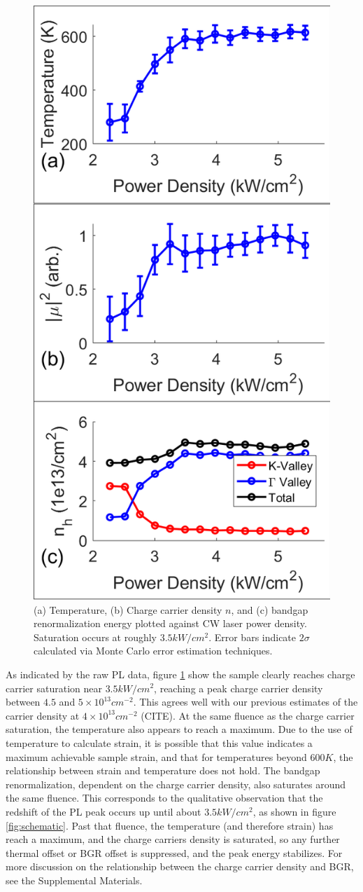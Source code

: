 \documentclass[aps,prl,preprint,superscriptaddress]{revtex4-2}
\begin{document}
\begin{figure}
	\includegraphics[width=0.5\linewidth]{fig_pars.png}
	\caption{(a) Temperature, (b) Charge carrier density $n$, and (c) bandgap renormalization energy plotted against CW laser power density. Saturation occurs at roughly $3.5 kW/cm^2$. Error bars indicate $2\sigma$ calculated via Monte Carlo error estimation techniques.}
	\label{fig:pars}
\end{figure}

As indicated by the raw PL data, figure \ref{fig:pars} show the sample clearly reaches charge carrier saturation near $3.5 kW/cm^2$, reaching a peak charge carrier density between $4.5$ and $5\times 10^{13}  cm^{-2}$. This agrees well with our previous estimates of the carrier density at $4 \times 10^{13}  cm^{-2}$ (CITE). At the same fluence as the charge carrier saturation, the temperature also appears to reach a maximum. Due to the use of temperature to calculate strain, it is possible that this value indicates a maximum achievable sample strain, and that for temperatures beyond $600 K$, the relationship between strain and temperature does not hold. The bandgap renormalization, dependent on the charge carrier density, also saturates around the same fluence. This corresponds to the qualitative observation that the redshift of the PL peak occurs up until about $3.5 kW/cm^2$, as shown in figure \ref{fig:schematic}. Past that fluence, the temperature (and therefore strain) has reach a maximum, and the charge carriers density is saturated, so any further thermal offset or BGR offset is suppressed, and the peak energy stabilizes. For more discussion on the relationship between the charge carrier density and BGR, see the Supplemental Materials.
\end{document}
